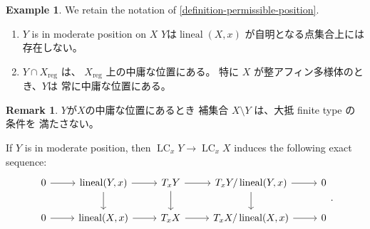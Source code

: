 \documentclass[a4paper,dvipdfmx,reqno,12pt]{amsart}
\theoremstyle{definition}
\newtheorem{example}[theorem]{Example}
\newtheorem{remark}[theorem]{Remark}
\newcommand{\opn}[1]{\operatorname{#1}}
\numberwithin{equation}{section}
\begin{document}
\begin{example}
We retain the notation of 
\cref{definition-permissible-position}.
\begin{enumerate}
\item $Y$ is in moderate position on $X$
$Y$は$\opn{lineal}(X,x)$
が自明となる点集合上には存在しない。
\item $Y\cap X_{\mathrm{reg}}$ は、
$X_{\mathrm{reg}}$ 上の中庸な位置にある。
特に $X$ が整アフィン多様体のとき、$Y$は
常に中庸な位置にある。
\end{enumerate}

\begin{remark}
$Y$が$X$の中庸な位置にあるとき
補集合 $X\setminus Y$ は、大抵 finite type の条件を
満たさない。
\end{remark}

\end{example}
If $Y$ is in moderate position, then 
$\opn{LC}_x Y\to \opn{LC}_x X$ induces the following 
exact sequence:
\[\begin{tikzcd}
	0 & {\opn{lineal}(Y,x)} & {T_x Y} & {T_x Y/\opn{lineal}(Y,x)} & 0 \\
	0 & {\opn{lineal}(X,x)} & {T_x X} & 
{T_x X/\opn{lineal}(X,x)} & 0
	\arrow[from=1-1, to=1-2]
	\arrow[from=2-1, to=2-2]
	\arrow[from=2-3, to=2-4]
	\arrow[from=1-3, to=1-4]
	\arrow[from=1-4, to=2-4]
	\arrow[from=1-2, to=2-2]
	\arrow[from=1-2, to=1-3]
	\arrow[from=2-2, to=2-3]
	\arrow[from=1-3, to=2-3]
	\arrow[from=2-4, to=2-5]
	\arrow[from=1-4, to=1-5]
\end{tikzcd}.\]
\end{document}

